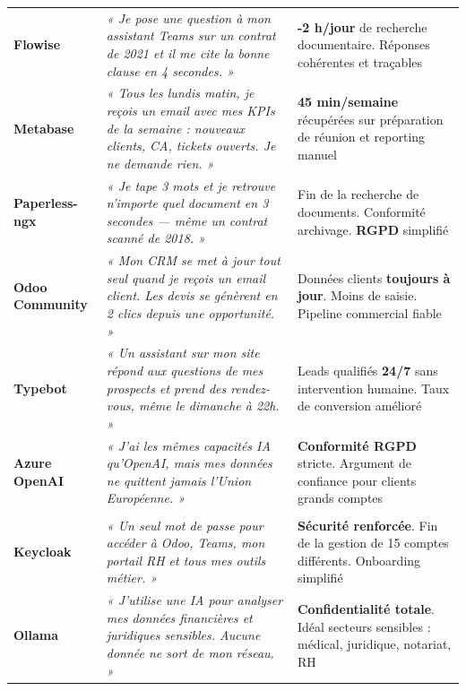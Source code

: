 \begin{footnotesize}
\begin{longtable}{>{\bfseries}p{2.2cm} p{6.8cm} p{5.0cm}}
\rowcolor{navylight!5}
Flowise &
\textit{« Je pose une question à mon assistant Teams sur un contrat de 2021 et il me cite la bonne clause en 4 secondes. »} &
\textbf{-2 h/jour} de recherche documentaire. Réponses cohérentes et traçables \\

\rowcolor{rowgray}
Metabase &
\textit{« Tous les lundis matin, je reçois un email avec mes KPIs de la semaine : nouveaux clients, CA, tickets ouverts. Je ne demande rien. »} &
\textbf{45 min/semaine} récupérées sur préparation de réunion et reporting manuel \\

\rowcolor{navylight!5}
Paperless-ngx &
\textit{« Je tape 3 mots et je retrouve n'importe quel document en 3 secondes — même un contrat scanné de 2018. »} &
Fin de la recherche de documents. Conformité archivage. \textbf{RGPD} simplifié \\

\rowcolor{rowgray}
Odoo Community &
\textit{« Mon CRM se met à jour tout seul quand je reçois un email client. Les devis se génèrent en 2 clics depuis une opportunité. »} &
Données clients \textbf{toujours à jour}. Moins de saisie. Pipeline commercial fiable \\

\rowcolor{navylight!5}
Typebot &
\textit{« Un assistant sur mon site répond aux questions de mes prospects et prend des rendez-vous, même le dimanche à 22h. »} &
Leads qualifiés \textbf{24/7} sans intervention humaine. Taux de conversion amélioré \\

\rowcolor{rowgray}
Azure OpenAI &
\textit{« J'ai les mêmes capacités IA qu'OpenAI, mais mes données ne quittent jamais l'Union Européenne. »} &
\textbf{Conformité RGPD} stricte. Argument de confiance pour clients grands comptes \\

\multicolumn{3}{l}{\cellcolor{colgold!12}\textcolor{colgold}{\textbf{$\triangleright$ R\&D — Valeur différenciante à venir}}} \\[2pt]

\rowcolor{colgold!5}
Keycloak &
\textit{« Un seul mot de passe pour accéder à Odoo, Teams, mon portail RH et tous mes outils métier. »} &
\textbf{Sécurité renforcée}. Fin de la gestion de 15 comptes différents. Onboarding simplifié \\

\rowcolor{rowgray}
Ollama &
\textit{« J'utilise une IA pour analyser mes données financières et juridiques sensibles. Aucune donnée ne sort de mon réseau. »} &
\textbf{Confidentialité totale}. Idéal secteurs sensibles : médical, juridique, notariat, RH \\

\end{longtable}
\end{footnotesize}
